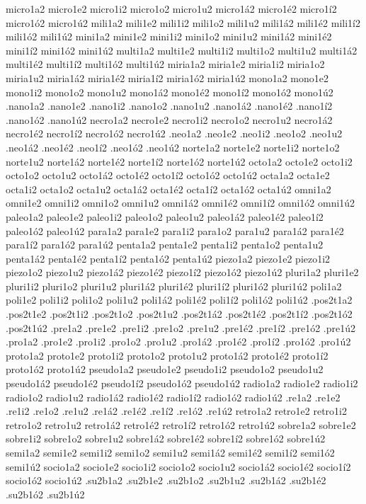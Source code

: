 {micro1a2 micro1e2 micro1i2 micro1o2 micro1u2 micro1á2 micro1é2 micro1í2 micro1ó2 micro1ú2
mili1a2 mili1e2 mili1i2 mili1o2 mili1u2 mili1á2 mili1é2 mili1í2 mili1ó2 mili1ú2
mini1a2 mini1e2 mini1i2 mini1o2 mini1u2 mini1á2 mini1é2 mini1í2 mini1ó2 mini1ú2
multi1a2 multi1e2 multi1i2 multi1o2 multi1u2 multi1á2 multi1é2 multi1í2 multi1ó2 multi1ú2
miria1a2 miria1e2 miria1i2 miria1o2 miria1u2 miria1á2 miria1é2 miria1í2 miria1ó2 miria1ú2
mono1a2 mono1e2 mono1i2 mono1o2 mono1u2 mono1á2 mono1é2 mono1í2 mono1ó2 mono1ú2
.nano1a2 .nano1e2 .nano1i2 .nano1o2 .nano1u2 .nano1á2 .nano1é2 .nano1í2 .nano1ó2 .nano1ú2
necro1a2 necro1e2 necro1i2 necro1o2 necro1u2 necro1á2 necro1é2 necro1í2 necro1ó2 necro1ú2
.neo1a2 .neo1e2 .neo1i2 .neo1o2 .neo1u2 .neo1á2 .neo1é2 .neo1í2 .neo1ó2 .neo1ú2
norte1a2 norte1e2 norte1i2 norte1o2 norte1u2 norte1á2 norte1é2 norte1í2 norte1ó2 norte1ú2
octo1a2 octo1e2 octo1i2 octo1o2 octo1u2 octo1á2 octo1é2 octo1í2 octo1ó2 octo1ú2
octa1a2 octa1e2 octa1i2 octa1o2 octa1u2 octa1á2 octa1é2 octa1í2 octa1ó2 octa1ú2
omni1a2 omni1e2 omni1i2 omni1o2 omni1u2 omni1á2 omni1é2 omni1í2 omni1ó2 omni1ú2
paleo1a2 paleo1e2 paleo1i2 paleo1o2 paleo1u2 paleo1á2 paleo1é2 paleo1í2 paleo1ó2 paleo1ú2
para1a2 para1e2 para1i2 para1o2 para1u2 para1á2 para1é2 para1í2 para1ó2 para1ú2
penta1a2 penta1e2 penta1i2 penta1o2 penta1u2 penta1á2 penta1é2 penta1í2 penta1ó2 penta1ú2
piezo1a2 piezo1e2 piezo1i2 piezo1o2 piezo1u2 piezo1á2 piezo1é2 piezo1í2 piezo1ó2 piezo1ú2
pluri1a2 pluri1e2 pluri1i2 pluri1o2 pluri1u2 pluri1á2 pluri1é2 pluri1í2 pluri1ó2 pluri1ú2
poli1a2 poli1e2 poli1i2 poli1o2 poli1u2 poli1á2 poli1é2 poli1í2 poli1ó2 poli1ú2
.pos2t1a2 .pos2t1e2 .pos2t1i2 .pos2t1o2 .pos2t1u2 .pos2t1á2 .pos2t1é2 .pos2t1í2 .pos2t1ó2 .pos2t1ú2
.pre1a2 .pre1e2 .pre1i2 .pre1o2 .pre1u2          .pre1é2 .pre1í2 .pre1ó2 .pre1ú2
.pro1a2 .pro1e2 .pro1i2 .pro1o2 .pro1u2 .pro1á2 .pro1é2 .pro1í2 .pro1ó2 .pro1ú2
proto1a2 proto1e2 proto1i2 proto1o2 proto1u2 proto1á2 proto1é2 proto1í2 proto1ó2 proto1ú2
pseudo1a2 pseudo1e2 pseudo1i2 pseudo1o2 pseudo1u2 pseudo1á2 pseudo1é2 pseudo1í2 pseudo1ó2 pseudo1ú2
radio1a2 radio1e2 radio1i2 radio1o2 radio1u2 radio1á2 radio1é2 radio1í2 radio1ó2 radio1ú2
.re1a2 .re1e2 .re1i2 .re1o2 .re1u2 .re1á2 .re1é2 .re1í2 .re1ó2 .re1ú2
retro1a2 retro1e2 retro1i2 retro1o2 retro1u2 retro1á2 retro1é2 retro1í2 retro1ó2 retro1ú2
sobre1a2 sobre1e2 sobre1i2 sobre1o2 sobre1u2 sobre1á2 sobre1é2 sobre1í2 sobre1ó2 sobre1ú2
semi1a2 semi1e2 semi1i2 semi1o2 semi1u2 semi1á2 semi1é2 semi1í2 semi1ó2 semi1ú2
socio1a2 socio1e2 socio1i2 socio1o2 socio1u2 socio1á2 socio1é2 socio1í2 socio1ó2 socio1ú2
.su2b1a2 .su2b1e2          .su2b1o2 .su2b1u2 .su2b1á2 .su2b1é2           .su2b1ó2 .su2b1ú2
}
